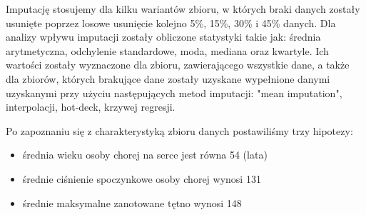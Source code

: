 \documentclass{classrep}
\begin{document}
{\begin{table}
            \label{opis-zbioru-danych}
        \end{table}
        \FloatBarrier
        Imputację stosujemy dla kilku wariantów zbioru, w których braki danych zostały
        usunięte poprzez losowe usunięcie kolejno 5\%, 15\%, 30\% i 45\% danych. Dla
        analizy wpływu imputacji zostały obliczone statystyki takie jak: średnia
        arytmetyczna, odchylenie standardowe, moda, mediana oraz kwartyle. Ich wartości
        zostały wyznaczone dla zbioru, zawierającego wszystkie dane, a także dla
        zbiorów, których brakujące dane zostały uzyskane wypełnione danymi uzyskanymi
        przy użyciu następujących metod imputacji: "mean imputation", interpolacji,
        hot-deck, krzywej regresji.
        
        Po zapoznaniu się z charakterystyką zbioru danych postawiliśmy trzy hipotezy:
        \begin{itemize}
            \item średnia wieku osoby chorej na serce jest równa 54 (lata)
            \item średnie ciśnienie spoczynkowe osoby chorej wynosi 131
            \item średnie maksymalne zanotowane tętno wynosi 148
        \end{itemize}
    }
\end{document}
